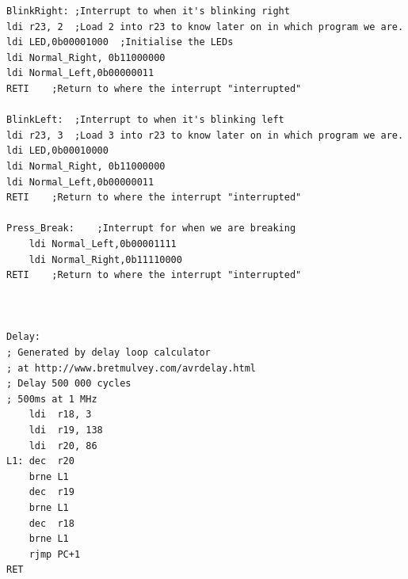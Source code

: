 \documentclass[a4paper,12pt]{article}
\begin{document}
\begin{lstlisting}
BlinkRight:	;Interrupt to when it's blinking right
ldi r23, 2	;Load 2 into r23 to know later on in which program we are.
ldi LED,0b00001000	;Initialise the LEDs
ldi Normal_Right, 0b11000000
ldi Normal_Left,0b00000011
RETI	;Return to where the interrupt "interrupted"

BlinkLeft:	;Interrupt to when it's blinking left
ldi r23, 3	;Load 3 into r23 to know later on in which program we are.
ldi LED,0b00010000
ldi Normal_Right, 0b11000000
ldi Normal_Left,0b00000011
RETI	;Return to where the interrupt "interrupted"
	
Press_Break:	;Interrupt for when we are breaking
	ldi Normal_Left,0b00001111
	ldi Normal_Right,0b11110000
RETI	;Return to where the interrupt "interrupted"
		


Delay:
; Generated by delay loop calculator
; at http://www.bretmulvey.com/avrdelay.html
; Delay 500 000 cycles
; 500ms at 1 MHz
    ldi  r18, 3
    ldi  r19, 138
    ldi  r20, 86
L1: dec  r20
    brne L1
    dec  r19
    brne L1
    dec  r18
    brne L1
    rjmp PC+1
RET
\end{lstlisting}
\end{document}
